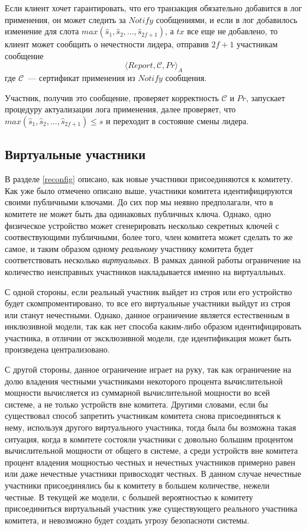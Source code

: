 Если клиент хочет гарантировать, что его транзакция обязательно добавится в лог применения, он может следить за $Notify$ сообщениями, и если в лог добавилось изменение для слота  $max(\hat{s}_1,  \hat{s}_2,..., \hat{s}_{2f+1})$, а $tx$ все еще не добавлено, то клиент может сообщить о нечестности лидера, отправив $2f+1$ участникам сообщение
\[ \langle Report, \mathcal{C}, Pr \rangle_A \]
где $\mathcal{C}$~--- сертификат применения из $Notify$ сообщения.

Участник, получив это сообщение, проверяет корректность $\mathcal{C}$ и $Pr$, запускает процедуру актуализации лога применения, далее проверяет, что $max(\hat{s}_1,  \hat{s}_2,..., \hat{s}_{2f+1}) \le s$ и переходит в состояние смены лидера.

\subsection{Виртуальные участники}
В разделе \ref{reconfig} описано, как новые участники присоединяются к комитету. Как уже было отмечено описано выше, участники комитета идентифицируются своими публичными ключами. До сих пор мы неявно предполагали, что в комитете не может быть два одинаковых публичных ключа. Однако, одно физическое устройство может сгенерировать несколько секретных ключей с соотвествующими публичными, более того, член комитета может сделать то же самое, и таким образом одному \textit{реальному} участнику комитета будет соответствовать несколько \textit{виртуальных}. В рамках данной работы ограничение на количество неисправных участников накладывается именно на виртуалльных.

С одной стороны, если реальный участник выйдет из строя или его устройство будет скомпроментировано, то все его виртуальные участники выйдут из строя или станут нечестными.  Однако, данное ограничение является естественным в инклюзивной модели, так как нет способа каким-либо образом идентифицировать участника, в отличии от эксклюзивной модели, где идентификация может быть произведена централизовано.

С другой стороны, данное ограничение играет на руку, так как ограничение на долю владения честными участниками некоторого процента вычислительной мощности вычисляется из суммарной вычислительной мощности во всей системе, а не только устройств вне комитета. Другими словами, если бы существовал способ запретить участникам комитета снова присоединяться к нему, используя другого виртуального участника, тогда была бы возможна такая ситуация, когда в комитете состояли участники с довольно большим процентом вычислительной мощности от общего в системе, а среди устройств вне комитета процент владения мощностью честных и нечестных участников примерно равен или даже нечестные участники привосходят честных. В данном случае нечестные участники присоединялись бы к комитету в большем количестве, нежели честные. В текущей же модели, с большей вероятностью к комитету присоединиться виртуальный участник уже существующего реального участника комитета, и невозможно будет создать угрозу безопасноти системы.

